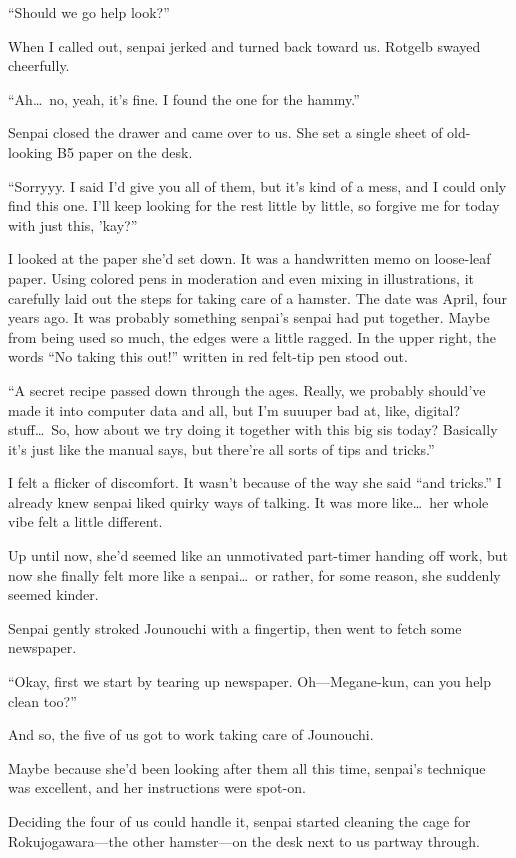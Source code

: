 \documentclass[
    a4paper,
    12pt,
    twoside,
    openany,
    UTF8,
    fontset=windows
]{ctexbook}
\begin{document}
``Should we go help look?''

When I called out, senpai jerked and turned back toward us. Rotgelb swayed cheerfully.

``Ah\dots\ no, yeah, it's fine. I found the one for the hammy.''

Senpai closed the drawer and came over to us. She set a single sheet of old-looking B5 paper on the desk.

``Sorryyy. I said I'd give you all of them, but it's kind of a mess, and I could only find this one. I'll keep looking for the rest little by little, so forgive me for today with just this, 'kay?''

I looked at the paper she'd set down. It was a handwritten memo on loose-leaf paper. Using colored pens in moderation and even mixing in illustrations, it carefully laid out the steps for taking care of a hamster. The date was April, four years ago. It was probably something senpai's senpai had put together. Maybe from being used so much, the edges were a little ragged. In the upper right, the words ``No taking this out!'' written in red felt-tip pen stood out.

``A secret recipe passed down through the ages. Really, we probably should've made it into computer data and all, but I'm suuuper bad at, like, digital? stuff\dots\ So, how about we try doing it together with this big sis today? Basically it's just like the manual says, but there're all sorts of tips and tricks.''

I felt a flicker of discomfort. It wasn't because of the way she said ``and tricks.'' I already knew senpai liked quirky ways of talking. It was more like\dots\ her whole vibe felt a little different.

Up until now, she'd seemed like an unmotivated part-timer handing off work, but now she finally felt more like a senpai\dots\ or rather, for some reason, she suddenly seemed kinder.

Senpai gently stroked Jounouchi with a fingertip, then went to fetch some newspaper.

``Okay, first we start by tearing up newspaper. Oh---Megane-kun, can you help clean too?''

And so, the five of us got to work taking care of Jounouchi.

Maybe because she'd been looking after them all this time, senpai's technique was excellent, and her instructions were spot-on.

Deciding the four of us could handle it, senpai started cleaning the cage for Rokujogawara---the other hamster---on the desk next to us partway through.
\end{document}

